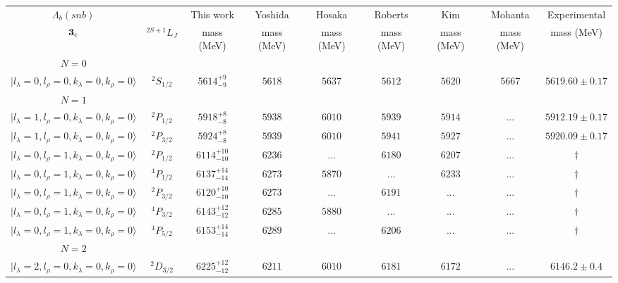 \begin{tabular}{c c| c c c c c c c}\hline \hline
$\Lambda_{b}(snb)$&                  & This work   &   Yoshida     &  Hosaka      &  Roberts    & Kim        & Mohanta    & Experimental  \\ 
${\bf {3}}_{\rm c}$  & $^{2S+1}L_{J}$ & mass (MeV)  &   mass (MeV)  &  mass (MeV)  &  mass (MeV) & mass (MeV) & mass (MeV) &      mass (MeV) \\ \hline
\hline
 $N=0$  &  &  &  &  &  \\ 
$\vert l_{\lambda}\!\!=\!0, l_{\rho}\!\!=\!0, k_{\lambda}\!\!=\!0, k_{\rho}\!\!=\!0 \rangle$ & $^{2}S_{1/2}$ & $5614^{+9}_{-9}$ & $5618$ & $5637$ & $5612$ & $5620$ & $5667$ & $5619.60\pm 0.17$ \\ 
\hline
 $N=1$  &  &  &  &  &  \\ 
$\vert l_{\lambda}\!\!=\!1, l_{\rho}\!\!=\!0, k_{\lambda}\!\!=\!0, k_{\rho}\!\!=\!0 \rangle$ & $^{2}P_{1/2}$ & $5918^{+8}_{-8}$ & $5938$ & $6010$ & $5939$ & $5914$ & ... & $5912.19\pm 0.17$ \\ 
$\vert l_{\lambda}\!\!=\!1, l_{\rho}\!\!=\!0, k_{\lambda}\!\!=\!0, k_{\rho}\!\!=\!0 \rangle$ & $^{2}P_{3/2}$ & $5924^{+8}_{-8}$ & $5939$ & $6010$ & $5941$ & $5927$ & ... & $5920.09\pm 0.17$ \\ 
$\vert l_{\lambda}\!\!=\!0, l_{\rho}\!\!=\!1, k_{\lambda}\!\!=\!0, k_{\rho}\!\!=\!0 \rangle$ & $^{2}P_{1/2}$ & $6114^{+10}_{-10}$ & $6236$ & ... & $6180$ & $6207$ & ... & $\dagger$ \\ 
$\vert l_{\lambda}\!\!=\!0, l_{\rho}\!\!=\!1, k_{\lambda}\!\!=\!0, k_{\rho}\!\!=\!0 \rangle$ & $^{4}P_{1/2}$ & $6137^{+14}_{-14}$ & $6273$ & $5870$ & ... & $6233$ & ... & $\dagger$ \\ 
$\vert l_{\lambda}\!\!=\!0, l_{\rho}\!\!=\!1, k_{\lambda}\!\!=\!0, k_{\rho}\!\!=\!0 \rangle$ & $^{2}P_{3/2}$ & $6120^{+10}_{-10}$ & $6273$ & ... & $6191$ & ... & ... & $\dagger$ \\ 
$\vert l_{\lambda}\!\!=\!0, l_{\rho}\!\!=\!1, k_{\lambda}\!\!=\!0, k_{\rho}\!\!=\!0 \rangle$ & $^{4}P_{3/2}$ & $6143^{+12}_{-12}$ & $6285$ & $5880$ & ... & ... & ... & $\dagger$ \\ 
$\vert l_{\lambda}\!\!=\!0, l_{\rho}\!\!=\!1, k_{\lambda}\!\!=\!0, k_{\rho}\!\!=\!0 \rangle$ & $^{4}P_{5/2}$ & $6153^{+14}_{-14}$ & $6289$ & ... & $6206$ & ... & ... & $\dagger$ \\ 
\hline
 $N=2$  &  &  &  &  &  \\ 
$\vert l_{\lambda}\!\!=\!2, l_{\rho}\!\!=\!0, k_{\lambda}\!\!=\!0, k_{\rho}\!\!=\!0 \rangle$ & $^{2}D_{3/2}$ & $6225^{+12}_{-12}$ & $6211$ & $6010$ & $6181$ & $6172$ & ... & $6146.2\pm 0.4$ \\ 

\end{tabular}
